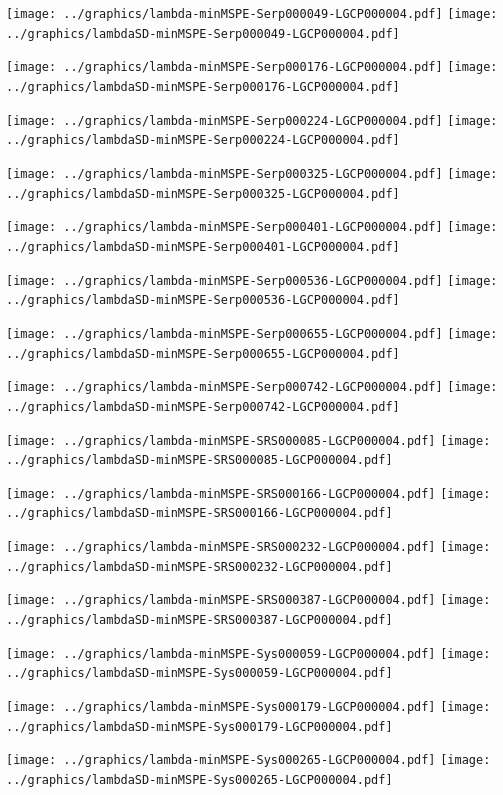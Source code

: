\documentclass[review]{elsarticle}
\begin{document}
\texttt{[image: ../graphics/lambda-minMSPE-Serp000049-LGCP000004.pdf]}
\texttt{[image: ../graphics/lambdaSD-minMSPE-Serp000049-LGCP000004.pdf]}

\texttt{[image: ../graphics/lambda-minMSPE-Serp000176-LGCP000004.pdf]}
\texttt{[image: ../graphics/lambdaSD-minMSPE-Serp000176-LGCP000004.pdf]}

\texttt{[image: ../graphics/lambda-minMSPE-Serp000224-LGCP000004.pdf]}
\texttt{[image: ../graphics/lambdaSD-minMSPE-Serp000224-LGCP000004.pdf]}

\texttt{[image: ../graphics/lambda-minMSPE-Serp000325-LGCP000004.pdf]}
\texttt{[image: ../graphics/lambdaSD-minMSPE-Serp000325-LGCP000004.pdf]}

\texttt{[image: ../graphics/lambda-minMSPE-Serp000401-LGCP000004.pdf]}
\texttt{[image: ../graphics/lambdaSD-minMSPE-Serp000401-LGCP000004.pdf]}

\texttt{[image: ../graphics/lambda-minMSPE-Serp000536-LGCP000004.pdf]}
\texttt{[image: ../graphics/lambdaSD-minMSPE-Serp000536-LGCP000004.pdf]}

\texttt{[image: ../graphics/lambda-minMSPE-Serp000655-LGCP000004.pdf]}
\texttt{[image: ../graphics/lambdaSD-minMSPE-Serp000655-LGCP000004.pdf]}

\texttt{[image: ../graphics/lambda-minMSPE-Serp000742-LGCP000004.pdf]}
\texttt{[image: ../graphics/lambdaSD-minMSPE-Serp000742-LGCP000004.pdf]}

\texttt{[image: ../graphics/lambda-minMSPE-SRS000085-LGCP000004.pdf]}
\texttt{[image: ../graphics/lambdaSD-minMSPE-SRS000085-LGCP000004.pdf]}

\texttt{[image: ../graphics/lambda-minMSPE-SRS000166-LGCP000004.pdf]}
\texttt{[image: ../graphics/lambdaSD-minMSPE-SRS000166-LGCP000004.pdf]}

\texttt{[image: ../graphics/lambda-minMSPE-SRS000232-LGCP000004.pdf]}
\texttt{[image: ../graphics/lambdaSD-minMSPE-SRS000232-LGCP000004.pdf]}

\texttt{[image: ../graphics/lambda-minMSPE-SRS000387-LGCP000004.pdf]}
\texttt{[image: ../graphics/lambdaSD-minMSPE-SRS000387-LGCP000004.pdf]}

\texttt{[image: ../graphics/lambda-minMSPE-Sys000059-LGCP000004.pdf]}
\texttt{[image: ../graphics/lambdaSD-minMSPE-Sys000059-LGCP000004.pdf]}

\texttt{[image: ../graphics/lambda-minMSPE-Sys000179-LGCP000004.pdf]}
\texttt{[image: ../graphics/lambdaSD-minMSPE-Sys000179-LGCP000004.pdf]}

\texttt{[image: ../graphics/lambda-minMSPE-Sys000265-LGCP000004.pdf]}
\texttt{[image: ../graphics/lambdaSD-minMSPE-Sys000265-LGCP000004.pdf]}
\end{document}
